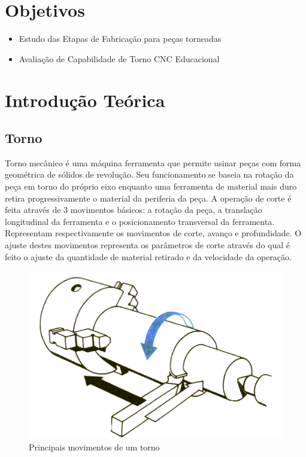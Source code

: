 \documentclass[a4paper,11pt]{article}
\title{\tituloRelatorio}
\begin{document}



\section{Objetivos}

\begin{itemize}
    \item Estudo das Etapas de Fabricação para peças torneadas
    \item Avaliação de Capabilidade de Torno CNC Educacional
\end{itemize}

\section{Introdução Teórica}

\subsection{Torno}
Torno mecânico é uma máquina ferramenta que permite usinar peças com forma geométrica de sólidos de revolução. Seu funcionamento se baseia na rotação da peça em torno do próprio eixo enquanto uma ferramenta de material mais duro retira progressivamente o material da periferia da peça. A operação de corte é feita através de 3 movimentos básicos: a rotação da peça, a translação longitudinal da ferramenta e o posicionamento transversal da ferramenta. Representam respectivamente os movimentos de corte, avanço e profundidade. O ajuste destes movimentos representa os parâmetros de corte através do qual é feito o ajuste da quantidade de material retirado e da velocidade da operação. 

\begin{figure}[H]
    \centering
    \includegraphics[width = 0.6\linewidth]{img/relat1/itornomove}
    \caption{Principais movimentos de um torno}
    \label{fig:torno}
\end{figure}
\end{document}
